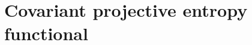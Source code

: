 \section{Covariant projective entropy functional}
\label{sec:projective-entropy-covariant}

  
  
  
